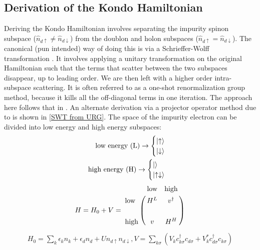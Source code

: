 \subsection{Derivation of the Kondo Hamiltonian}
Deriving the Kondo Hamiltonian involves separating the impurity spinon subspace (\(\hat n_{d\uparrow} \neq \hat n_{d\downarrow}\)) from the doublon and holon subspaces (\(\hat n_{d\uparrow} = \hat n_{d\downarrow}\)). The canonical (pun intended) way of doing this is via a Schrieffer-Wolff transformation \cite{Schrieffer_Wolff}. It involves applying a unitary transformation on the original Hamiltonian such that the terms that scatter between the two subspaces disappear, up to leading order. We are then left with a higher order intra-subspace scattering. It is often referred to as a one-shot renormalization group method, because it kills all the off-diagonal terms in one iteration. The approach here follows that in \cite{piers}. An alternate derivation via a projector operator method due to \cite{hewson} is shown in \ref{SWT from URG}.
The space of the impurity electron can be divided into low energy and high energy subspaces:
\begin{equation}\begin{aligned}
\text{low energy (L)} \rightarrow \begin{cases} \ket{\uparrow} \\ \ket{\downarrow} \end{cases}\\
\text{high energy (H)} \rightarrow \begin{cases} \ket{} \\ \ket{\uparrow\downarrow} \end{cases}\\
\end{aligned}\end{equation}
\begin{equation}\begin{aligned}
H = H_0 + V = \bordermatrix{~ & \text{low} & \text{high} \cr 
\text{low} & H^L & v^\dagger \cr
       &&\cr
\text{high} & v & H^H }
\end{aligned}\end{equation}
\begin{equation}\begin{aligned}
	H_0 = \sum_{k}\epsilon_k n_{k}+ \epsilon_d n_d + U n_{d\uparrow}n_{d\downarrow}, V=\sum_{k\sigma}\left(V_k c^\dagger_{k\sigma}c_{d\sigma} +V_k^* c^\dagger_{d\sigma}c_{k\sigma}\right)
\end{aligned}\end{equation}
